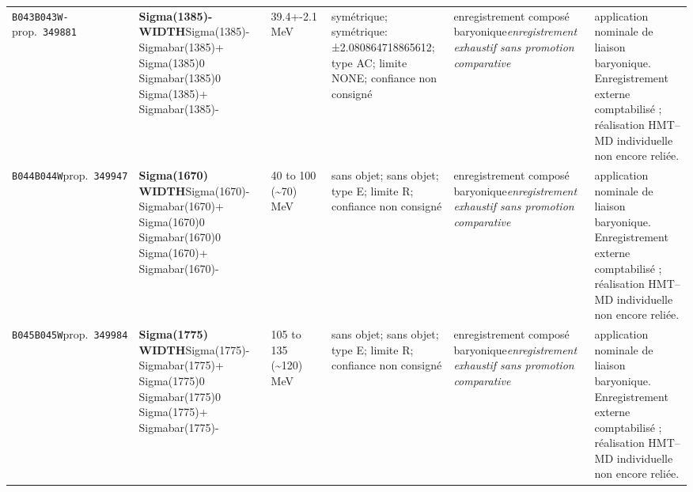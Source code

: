 \begin{landscape}
\begin{longtable}{L{1.85cm}L{4.45cm}L{2.35cm}L{4.05cm}L{3.35cm}L{7.15cm}}
\texttt{B043}\newline \texttt{B043W-}\newline prop.\ \texttt{349881} & \textbf{Sigma(1385)- WIDTH}\newline Sigma(1385)- \textbar{}\allowbreak{} Sigmabar(1385)+ \textbar{}\allowbreak{} Sigma(1385)0 \textbar{}\allowbreak{} Sigmabar(1385)0 \textbar{}\allowbreak{} Sigma(1385)+ \textbar{}\allowbreak{} Sigmabar(1385)- & 39.4+-2.1\,MeV & symétrique; symétrique: ±2.080864718865612; type AC; limite NONE; confiance non consigné & enregistrement composé baryonique\newline \emph{enregistrement exhaustif sans promotion comparative} & application nominale de liaison baryonique. Enregistrement externe comptabilisé ; réalisation HMT--MD individuelle non encore reliée. \\
\texttt{B044}\newline \texttt{B044W}\newline prop.\ \texttt{349947} & \textbf{Sigma(1670) WIDTH}\newline Sigma(1670)- \textbar{}\allowbreak{} Sigmabar(1670)+ \textbar{}\allowbreak{} Sigma(1670)0 \textbar{}\allowbreak{} Sigmabar(1670)0 \textbar{}\allowbreak{} Sigma(1670)+ \textbar{}\allowbreak{} Sigmabar(1670)- & 40 to 100 (\textasciitilde{}70)\,MeV & sans objet; sans objet; type E; limite R; confiance non consigné & enregistrement composé baryonique\newline \emph{enregistrement exhaustif sans promotion comparative} & application nominale de liaison baryonique. Enregistrement externe comptabilisé ; réalisation HMT--MD individuelle non encore reliée. \\
\texttt{B045}\newline \texttt{B045W}\newline prop.\ \texttt{349984} & \textbf{Sigma(1775) WIDTH}\newline Sigma(1775)- \textbar{}\allowbreak{} Sigmabar(1775)+ \textbar{}\allowbreak{} Sigma(1775)0 \textbar{}\allowbreak{} Sigmabar(1775)0 \textbar{}\allowbreak{} Sigma(1775)+ \textbar{}\allowbreak{} Sigmabar(1775)- & 105 to 135 (\textasciitilde{}120)\,MeV & sans objet; sans objet; type E; limite R; confiance non consigné & enregistrement composé baryonique\newline \emph{enregistrement exhaustif sans promotion comparative} & application nominale de liaison baryonique. Enregistrement externe comptabilisé ; réalisation HMT--MD individuelle non encore reliée. \\

\end{longtable}
\end{landscape}
